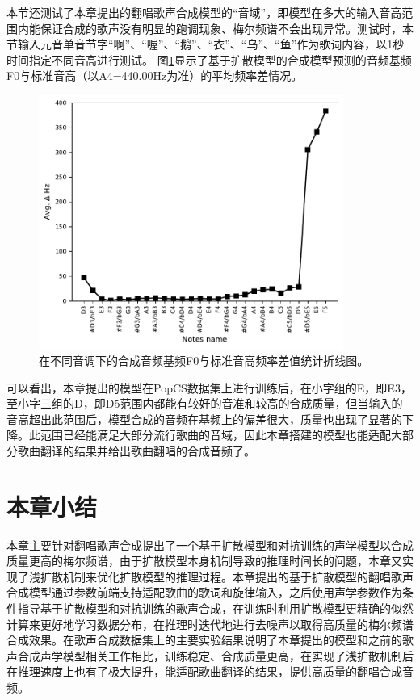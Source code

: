 本节还测试了本章提出的翻唱歌声合成模型的``音域''，即模型在多大的输入音高范围内能保证合成的歌声没有明显的跑调现象、梅尔频谱不会出现异常。测试时，本节输入元音单音节字``啊''、``喔''、``鹅''、``衣''、``乌''、``鱼''作为歌词内容，以1秒时间指定不同音高进行测试。
图\ref{fig:pitch_range_delta}显示了基于扩散模型的合成模型预测的音频基频F0与标准音高（以A4=440.00Hz为准）的平均频率差情况。
\begin{figure}[!ht]
  \centering
	\includegraphics[width=0.89\textwidth]{figure/svs/pitch_range_delta.pdf}
	\caption{在不同音调下的合成音频基频F0与标准音高频率差值统计折线图。}
\label{fig:pitch_range_delta}
\end{figure}
可以看出，本章提出的模型在PopCS数据集上进行训练后，在小字组的E，即E3，至小字三组的D，即D5范围内都能有较好的音准和较高的合成质量，但当输入的音高超出此范围后，模型合成的音频在基频上的偏差很大，质量也出现了显著的下降。此范围已经能满足大部分流行歌曲的音域，因此本章搭建的模型也能适配大部分歌曲翻译的结果并给出歌曲翻唱的合成音频了。
\section{本章小结}
本章主要针对翻唱歌声合成提出了一个基于扩散模型和对抗训练的声学模型以合成质量更高的梅尔频谱，由于扩散模型本身机制导致的推理时间长的问题，本章又实现了浅扩散机制\citep{diffsinger}来优化扩散模型的推理过程。本章提出的基于扩散模型的翻唱歌声合成模型通过参数前端支持适配歌曲的歌词和旋律输入，之后使用声学参数作为条件指导基于扩散模型和对抗训练的歌声合成，在训练时利用扩散模型更精确的似然计算来更好地学习数据分布，在推理时迭代地进行去噪声以取得高质量的梅尔频谱合成效果。在歌声合成数据集上的主要实验结果说明了本章提出的模型和之前的歌声合成声学模型相关工作相比，训练稳定、合成质量更高，在实现了浅扩散机制后在推理速度上也有了极大提升，能适配歌曲翻译的结果，提供高质量的翻唱合成音频。
